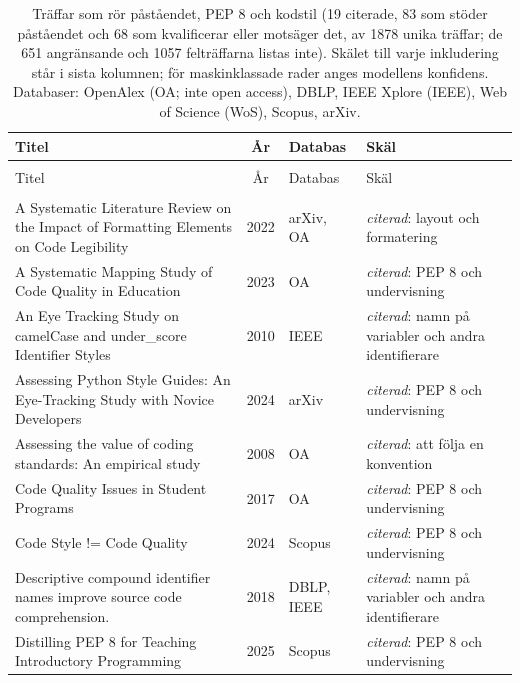 \begingroup\footnotesize
\begin{longtable}{@{}%
  >{\raggedright\arraybackslash}p{}c%
  >{\raggedright\arraybackslash}p{}%
  >{\raggedright\arraybackslash}p{}@{}}
\caption{Träffar som rör påståendet, PEP 8 och kodstil (19 citerade, 83 som stöder påståendet och 68 som kvalificerar eller motsäger det, av 1878 unika träffar; de 651 angränsande och 1057 felträffarna listas inte). Skälet till varje inkludering står i sista kolumnen; för maskinklassade rader anges modellens konfidens. Databaser: OpenAlex (OA; inte \foreignlanguage{english}{open access}), DBLP, IEEE Xplore (IEEE), Web of Science (WoS), Scopus, arXiv.}\label{tab:sok-pep8}\\
\toprule
Titel & År & Databas & Skäl \\
\midrule
\endfirsthead
\multicolumn{4}{@{}l}{\emph{\tablename~\thetable{} (\GetTranslation{continued})}}\\
\toprule
Titel & År & Databas & Skäl \\
\midrule
\endhead
\midrule \multicolumn{4}{r@{}}{\emph{\GetTranslation{continued on the next page}}}\\
\endfoot
\bottomrule
\endlastfoot
A Systematic Literature Review on the Impact of Formatting Elements on Code Legibility & 2022 & arXiv, OA & \emph{citerad}: layout och formatering \\
A Systematic Mapping Study of Code Quality in Education & 2023 & OA & \emph{citerad}: PEP 8 och undervisning \\
An Eye Tracking Study on camelCase and under\_score Identifier Styles & 2010 & IEEE & \emph{citerad}: namn på variabler och andra identifierare \\
Assessing Python Style Guides: An Eye-Tracking Study with Novice Developers & 2024 & arXiv & \emph{citerad}: PEP 8 och undervisning \\
Assessing the value of coding standards: An empirical study & 2008 & OA & \emph{citerad}: att följa en konvention \\
Code Quality Issues in Student Programs & 2017 & OA & \emph{citerad}: PEP 8 och undervisning \\
Code Style != Code Quality & 2024 & Scopus & \emph{citerad}: PEP 8 och undervisning \\
Descriptive compound identifier names improve source code comprehension. & 2018 & DBLP, IEEE & \emph{citerad}: namn på variabler och andra identifierare \\
Distilling PEP 8 for Teaching Introductory Programming & 2025 & Scopus & \emph{citerad}: PEP 8 och undervisning \\

\end{longtable}
